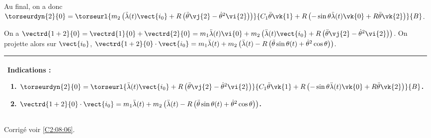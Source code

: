 Au final, on a donc $\torseurdyn{2}{0}=\torseurl{%
m_2\left(\ddot{\lambda}(t) \vect{i_0} + R \left(\ddot{\theta} \vj{2} - \dot{\theta}^2 \vi{2}\right)\right)
}{%
C_1  \ddot{\theta} \vk{1} + R\left( -\sin \theta \ddot{\lambda}(t) \vk{0} + R \ddot{\theta} \vk{2}\right)
}{B}$.
\else
\fi

\ifprof

On a $\vectrd{1+2}{0}=\vectrd{1}{0}+\vectrd{2}{0}=m_1\ddot{\lambda}(t)\vi{0}+m_2\left(\ddot{\lambda}(t) \vect{i_0} + R \left(\ddot{\theta} \vj{2} - \dot{\theta}^2 \vi{2}\right)\right)$.
On projette alors sur $\vect{i_0}$,
$\vectrd{1+2}{0}\cdot \vect{i_0} =m_1\ddot{\lambda}(t)+m_2\left(\ddot{\lambda}(t)-R \left(\ddot{\theta} \sin\theta(t)  + \dot{\theta}^2 \cos\theta \right)\right) $.
\else
\fi

\ifprof
\else
\footnotesize
\ifcolle
\else
\begin{center}
\begin{tabular}{|p{.9\linewidth}|}
\hline
Indications :
\begin{enumerate}
\item $\torseurdyn{2}{0}=\torseurl{\ddot{\lambda}(t) \vect{i_0} + R \left(\ddot{\theta} \vj{2} - \dot{\theta}^2 \vi{2}\right)}{C_1  \ddot{\theta} \vk{1} + R\left( -\sin \theta \ddot{\lambda}(t) \vk{0} + R \ddot{\theta} \vk{2}\right)}{B}$.
\item $\vectrd{1+2}{0}\cdot \vect{i_0}=m_1\ddot{\lambda}(t)+m_2\left(\ddot{\lambda}(t)- R \left(\ddot{\theta} \sin\theta(t)  + \dot{\theta}^2 \cos\theta \right)\right)$. 
\end{enumerate} \\ \hline
\end{tabular}
\end{center}
\normalsize
\fi
\begin{flushright}
\footnotesize{Corrigé  voir \ref{C2:08:06}.}
\end{flushright}%
\fi
